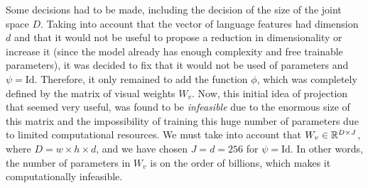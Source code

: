 Some decisions had to be made, including the decision of the size of the joint
space \(D\). Taking into account that the vector of language features had
dimension \(d\) and that it would not be useful to propose a reduction in
dimensionality or increase it (since the model already has enough complexity
and free trainable parameters), it was decided to fix that it would not be used
of parameters and \(\psi = \text{Id}\). Therefore, it only remained to add the
function \(\phi\), which was completely defined by the matrix of visual weights
\(W_v\). Now, this initial idea of projection that seemed very useful, was
found to be \emph{infeasible} due to the enormous size of this matrix and the
impossibility of training this huge number of parameters due to limited
computational resources. We must take into account that
\(W_v \in \mathbb{R}^{D \times J}\), where \(D = w \times h \times d\), and we have
chosen \(J = d = 256\) for \(\psi = \text{Id}\). In other words, the number of
parameters in \(W_v\) is on the order of billions, which makes it
computationally infeasible.

